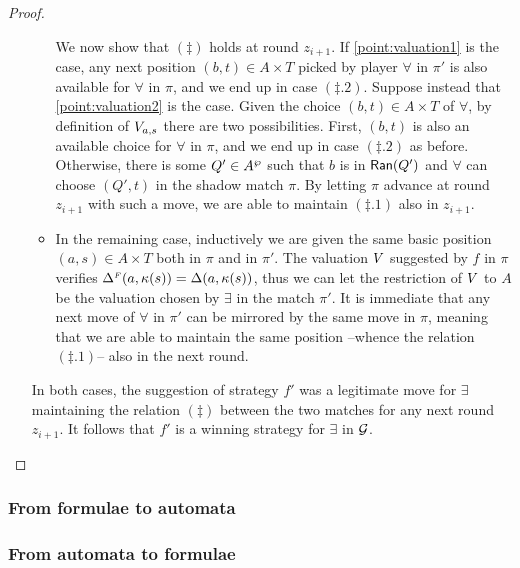 \begin{proof}
\begin{enumerate}[(i)]
\begin{itemize}
      We now show that $(\ddag)$ holds at round $z_{i+1}$. If \eqref{point:valuation1} is the case, any next position $(b,t)\in A \times T$ picked by player $\forall$ in $\pi'$ is also available for $\forall$ in $\pi$, and we end up in case $(\ddag .2)$. Suppose instead that \eqref{point:valuation2} is the case. Given the choice $(b,t) \in A \times T$ of $\forall$, by definition of $V_{a,s}$ there are two possibilities. First, $(b,t)$ is also an available choice for $\forall$ in $\pi$, and we end up in case $(\ddag .2)$ as before. Otherwise, there is some $Q' \in A^{\wp}$ such that $b$ is in $\mathsf{Ran}(Q')$ and $\forall$ can choose $(Q',t)$ in the shadow match $\pi$. By letting $\pi$ advance at round $z_{i+1}$ with such a move, we are able to maintain $(\ddag .1)$ also in $z_{i+1}$.
  \item In the remaining case, inductively we are given the same basic position $(a,s) \in A\times T$ both in $\pi$ and in $\pi'$. The valuation $V$ suggested by $f$ in $\pi$ verifies $\Delta^{{\scriptscriptstyle F}}(a,\kappa(s)) = \Delta(a,\kappa(s))$, thus we can let the restriction of $V$ to $A$ be the valuation chosen by $\exists$ in the match $\pi'$. It is immediate that any next move of $\forall$ in $\pi'$ can be mirrored by the same move in $\pi$, meaning that we are able to maintain the same position --whence the relation $(\ddag.1)$-- also in the next round.
\end{itemize}
In both cases, the suggestion of strategy $f'$ was a legitimate move for $\exists$ maintaining the relation $(\ddag)$ between the two matches for any next round $z_{i+1}$. It follows that $f'$ is a winning strategy for $\exists$ in $\mathcal{G}$.
\end{enumerate}
\end{proof}





\subsubsection{From formulae to automata}


\subsubsection{From automata to formulae}
